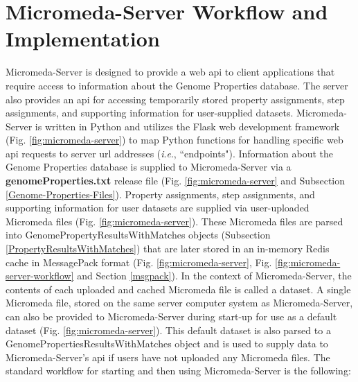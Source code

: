\section{Micromeda-Server Workflow and Implementation} \label{server-workflow}

Micromeda-Server is designed to provide a web \gls{api} to client applications 
that require access to information about the Genome Properties database. The 
server also provides an \gls{api} for accessing temporarily stored property 
assignments, step assignments, and supporting information for user-supplied 
datasets. Micromeda-Server is written in Python and utilizes the Flask web 
development framework \cite{grinberg2018flask} (Fig. \ref{fig:micromeda-server}) 
to map Python functions for handling specific web \gls{api} requests to server 
\gls{url} addresses (\textit{i}.\textit{e}., ``endpoints"). Information about 
the Genome Properties database is supplied to Micromeda-Server via a 
\textbf{genomeProperties.txt} release file (Fig. \ref{fig:micromeda-server} and 
Subsection \ref{Genome-Properties-Files}). Property assignments, step 
assignments, and supporting information for user datasets are supplied via 
user-uploaded Micromeda files (Fig. \ref{fig:micromeda-server}). These Micromeda 
files are parsed into GenomePropertyResultsWithMatches objects (Subsection 
\ref{PropertyResultsWithMatches}) that are later stored in an in-memory Redis 
cache \cite{han2011survey} in MessagePack format \cite{furuhashi2013messagepack} 
(Fig. \ref{fig:micromeda-server}, Fig. \ref{fig:micromeda-server-workflow} and 
Section \ref{msgpack}). In the context of Micromeda-Server, the contents of each 
uploaded and cached Micromeda file is called a dataset. A single Micromeda file, 
stored on the same server computer system as Micromeda-Server, can also be 
provided to Micromeda-Server during start-up for use as a default dataset (Fig. 
\ref{fig:micromeda-server}). This default dataset is also parsed to a 
GenomePropertiesResultsWithMatches object and is used to supply data to 
Micromeda-Server's \gls{api} if users have not uploaded any Micromeda files. The 
standard workflow for starting and then using Micromeda-Server is the following:

